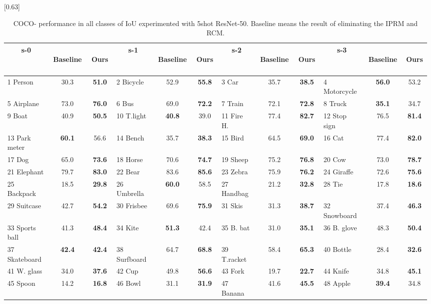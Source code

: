\documentclass[runningheads]{llncs}
\begin{document}
\begin{table}[htb]
\centering \caption{COCO- performance in all classes of IoU experimented with 5shot ResNet-50. Baseline means the result of eliminating the IPRM and RCM.}
\label{tb:iou}
  \scalebox{0.63}[0.63]{ 
  \begin{tabular}{lcc|lcc|lcc|lcc} \hline \multicolumn{1}{c}{s-0} &\, Baseline \, & \, \textbf{Ours} \,
    &\multicolumn{1}{c}{s-1} &\, Baseline \, & \, \textbf{Ours} \,
    &\multicolumn{1}{c}{s-2} &\, Baseline \, & \, \textbf{Ours} \,
    &\multicolumn{1}{c}{s-3} &\, Baseline \, & \, \textbf{Ours} 
    \\ \hline \hline 1 Person& 30.3 & \textbf{51.0} &2 Bicycle& 52.9 & \textbf{55.8} &3 Car& 35.7 & \textbf{38.5} &4 Motorcycle& \textbf{56.0} & 53.2 \\
5 Airplane& 73.0 & \textbf{76.0} &6 Bus& 69.0 & \textbf{72.2} &7 Train& 72.1 & \textbf{72.8} &8 Truck& \textbf{35.1} & 34.7 \\
9 Boat& 40.9 & \textbf{50.5} &10 T.light& \textbf{40.8} & 39.0 &11 Fire H.& 77.4 & \textbf{82.7} &12 Stop sign& 76.5 & \textbf{81.4} \\
13 Park meter& \textbf{60.1} & 56.6 &14 Bench& 35.7 & \textbf{38.3} &15 Bird& 64.5 & \textbf{69.0} &16 Cat& 77.4 & \textbf{82.0} \\
17 Dog& 65.0 & \textbf{73.6} &18 Horse& 70.6 & \textbf{74.7} &19 Sheep& 75.2 & \textbf{76.8} &20 Cow& 73.0 & \textbf{78.7} \\
21 Elephant& 79.7 & \textbf{83.0} &22 Bear& 83.6 & \textbf{85.6} &23 Zebra& 75.9 & \textbf{76.2} &24 Giraffe& 72.6 & \textbf{75.6} \\
25 Backpack& 18.5 & \textbf{29.8} &26 Umbrella& \textbf{60.0} & 58.5 &27 Handbag& 21.2 & \textbf{32.8} &28 Tie& 17.8 & \textbf{18.6} \\
29 Suitcase& 42.7 & \textbf{54.2} &30 Frisbee& 69.6 & \textbf{75.9} &31 Skis& 31.3 & \textbf{38.7} &32 Snowboard& 37.4 & \textbf{46.3} \\
33 Sports ball& 41.3 & \textbf{48.4} &34 Kite& \textbf{51.3} & 42.4 &35 B. bat& 31.0 & \textbf{35.1} &36 B. glove& 48.3 & \textbf{50.4} \\
37 Skateboard& \textbf{42.4} & \textbf{42.4} &38 Surfboard& 64.7 & \textbf{68.8} &39 T.racket& 58.4 & \textbf{65.3} &40 Bottle& 28.4 & \textbf{32.6} \\
41 W. glass& 34.0 & \textbf{37.6} &42 Cup& 49.8 & \textbf{56.6} &43 Fork& 19.7 & \textbf{22.7} &44 Knife& 34.8 & \textbf{45.1 }\\
45 Spoon& 14.2 & \textbf{16.8} &46 Bowl& 31.1 & \textbf{31.9} &47 Banana& 41.6 & \textbf{45.5} &48 Apple& \textbf{39.4} & 34.8 \\

\end{tabular}}
\end{table}
\end{document}
